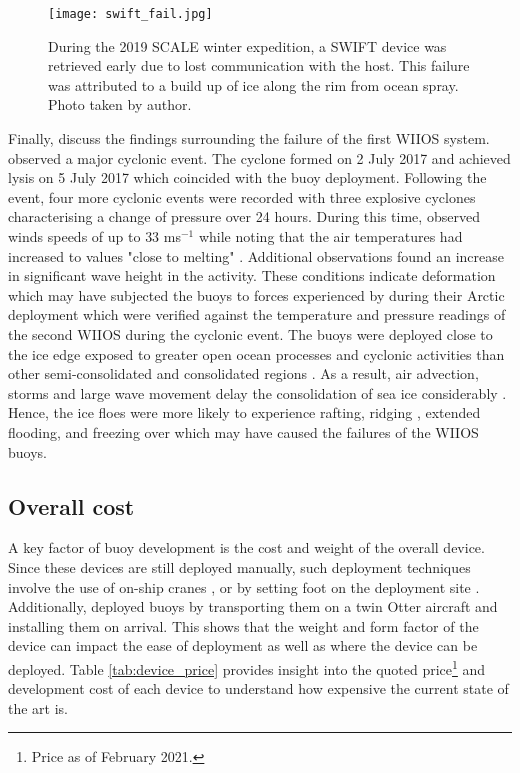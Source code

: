 \begin{figure}[H]
	\centering
	\texttt{[image: swift\_fail.jpg]}
	\caption{During the 2019 SCALE winter expedition, a SWIFT device was retrieved early due to lost communication with the host. This failure was attributed to a build up of ice along the rim from ocean spray. Photo taken by author.}
	\label{fig:swift_fail}
\end{figure}

Finally, \textcite{vichi2019effects} discuss the findings surrounding the failure of the first WIIOS system. \textcite{vichi2019effects} observed a major cyclonic event. The cyclone formed on  2 July 2017 and achieved lysis on 5 July 2017 which coincided with the buoy deployment. Following the event, four more cyclonic events were recorded with three explosive cyclones \cite{vichi2019effects} characterising a change of pressure over 24 hours. During this time, \textcite{vichi2019effects} observed winds speeds of up to $33$ ms$^{-1}$ while noting that the air temperatures had increased to values "close to melting" \cite{vichi2019effects}. Additional observations found an increase in significant wave height in the activity. These conditions indicate deformation \cite{vichi2019effects} which may have subjected the buoys to forces experienced by \cite{doble2017robust} during their Arctic deployment which were verified against the temperature and pressure readings of the second WIIOS during the cyclonic event. The buoys were deployed close to the ice edge exposed to greater open ocean processes and cyclonic activities than other semi-consolidated and consolidated regions \cite{vichi2019effects}. As a result, air advection, storms and large wave movement delay the consolidation of sea ice considerably \cite{vichi2019effects}. Hence, the ice floes were more likely to experience rafting, ridging \cite{icedefinition1992}, extended flooding, and freezing over which may have caused the failures of the WIIOS buoys.

\subsection{Overall cost}
\label{subsec:sec2_overallcost}
A key factor of buoy development is the cost and weight of the overall device. Since these devices are still deployed manually, such deployment techniques involve the use of on-ship cranes \cite{alberello2019drift,kohout2015device}, or by setting foot on the deployment site \cite{planck2019evolution,rabault2019open}. Additionally, \textcite{doble2017robust} deployed buoys by transporting them on a twin Otter aircraft and installing them on arrival. This shows that the weight and form factor of the device can impact the ease of deployment as well as where the device can be deployed. Table \ref{tab:device_price} provides insight into the quoted price\footnote[1]{Price as of February 2021.} and development cost of each device to understand how expensive the current state of the art is.


